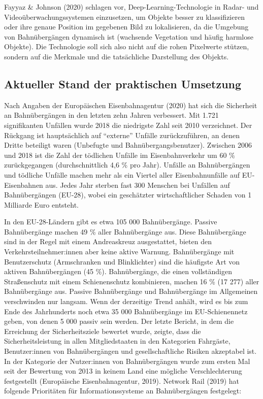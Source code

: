 \documentclass[
]{book}
\begin{document}
\begin{itemize}
\end{itemize}

Fayyaz \& Johnson (2020) schlagen vor, Deep-Learning-Technologie in Radar- und Videoüberwachungssystemen einzusetzen, um Objekte besser zu klassifizieren oder ihre genaue Position im gegebenen Bild zu lokalisieren, da die Umgebung von Bahnübergängen dynamisch ist (wachsende Vegetation und häufig harmlose Objekte). Die Technologie soll sich also nicht auf die rohen Pixelwerte stützen, sondern auf die Merkmale und die tatsächliche Darstellung des Objekts.

\hypertarget{aktueller-stand-der-praktischen-umsetzung-2}{%
\subsection*{Aktueller Stand der praktischen Umsetzung}\label{aktueller-stand-der-praktischen-umsetzung-2}}

Nach Angaben der Europäischen Eisenbahnagentur (2020) hat sich die Sicherheit an Bahnübergängen in den letzten zehn Jahren verbessert. Mit 1.721 signifikanten Unfällen wurde 2018 die niedrigste Zahl seit 2010 verzeichnet. Der Rückgang ist hauptsächlich auf ``externe'' Unfälle zurückzuführen, an denen Dritte beteiligt waren (Unbefugte und Bahnübergangsbenutzer). Zwischen 2006 und 2018 ist die Zahl der tödlichen Unfälle im Eisenbahnverkehr um 60 \% zurückgegangen (durchschnittlich 4,6 \% pro Jahr). Unfälle an Bahnübergängen und tödliche Unfälle machen mehr als ein Viertel aller Eisenbahnunfälle auf EU-Eisenbahnen aus. Jedes Jahr sterben fast 300 Menschen bei Unfällen auf Bahnübergängen (EU-28), wobei ein geschätzter wirtschaftlicher Schaden von 1 Milliarde Euro entsteht.

In den EU-28-Ländern gibt es etwa 105 000 Bahnübergänge. Passive Bahnübergänge machen 49 \% aller Bahnübergänge aus. Diese Bahnübergänge sind in der Regel mit einem Andreaskreuz ausgestattet, bieten den Verkehrsteilnehmer:innen aber keine aktive Warnung. Bahnübergänge mit Benutzerschutz (Armschranken und Blinklichter) sind die häufigste Art von aktiven Bahnübergängen (45 \%). Bahnübergänge, die einen vollständigen Straßenschutz mit einem Schienenschutz kombinieren, machen 16 \% (17 277) aller Bahnübergänge aus. Passive Bahnübergänge und Bahnübergänge im Allgemeinen verschwinden nur langsam. Wenn der derzeitige Trend anhält, wird es bis zum Ende des Jahrhunderts noch etwa 35 000 Bahnübergänge im EU-Schienennetz geben, von denen 5 000 passiv sein werden. Der letzte Bericht, in dem die Erreichung der Sicherheitsziele bewertet wurde, zeigte, dass die Sicherheitsleistung in allen Mitgliedstaaten in den Kategorien Fahrgäste, Benutzer:innen von Bahnübergängen und gesellschaftliche Risiken akzeptabel ist. In der Kategorie der Nutzer:innen von Bahnübergängen wurde zum ersten Mal seit der Bewertung von 2013 in keinem Land eine mögliche Verschlechterung festgestellt (Europäische Eisenbahnagentur, 2019). Network Rail (2019) hat folgende Prioritäten für Informationssysteme an Bahnübergängen festgelegt:
\end{document}
